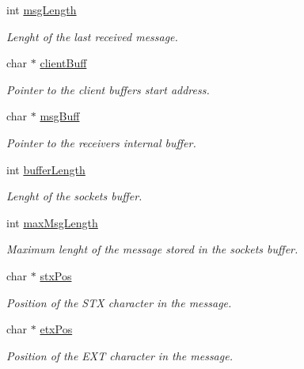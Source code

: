 \begin{DoxyCompactItemize}
\item 
int \hyperlink{struct_m_p___r_e_c_e_i_v_e_r_s_t_r_a470ff37d8c92bdd5c64fbdce0ad5231b}{msg\+Length}
\begin{DoxyCompactList}\small\item\em Lenght of the last received message. \end{DoxyCompactList}\item 
char $\ast$ \hyperlink{struct_m_p___r_e_c_e_i_v_e_r_s_t_r_ad7596f9bf59cc07314a716781969cf96}{client\+Buff}
\begin{DoxyCompactList}\small\item\em Pointer to the client buffer\textquotesingle{}s start address. \end{DoxyCompactList}\item 
char $\ast$ \hyperlink{struct_m_p___r_e_c_e_i_v_e_r_s_t_r_a79e1507f8db9f4b76e641a8ad6f05729}{msg\+Buff}
\begin{DoxyCompactList}\small\item\em Pointer to the receiver\textquotesingle{}s internal buffer. \end{DoxyCompactList}\item 
int \hyperlink{struct_m_p___r_e_c_e_i_v_e_r_s_t_r_a178a88ce8bf1f116a5d9ce779f71ca86}{buffer\+Length}
\begin{DoxyCompactList}\small\item\em Lenght of the socket\textquotesingle{}s buffer. \end{DoxyCompactList}\item 
int \hyperlink{struct_m_p___r_e_c_e_i_v_e_r_s_t_r_a26a2ef9150d7d3fe094647e715bb60a4}{max\+Msg\+Length}
\begin{DoxyCompactList}\small\item\em Maximum lenght of the message stored in the socket\textquotesingle{}s buffer. \end{DoxyCompactList}\item 
char $\ast$ \hyperlink{struct_m_p___r_e_c_e_i_v_e_r_s_t_r_ac1722435ceb1acbb5e33799c13e6564f}{stx\+Pos}
\begin{DoxyCompactList}\small\item\em Position of the S\+TX character in the message. \end{DoxyCompactList}\item 
char $\ast$ \hyperlink{struct_m_p___r_e_c_e_i_v_e_r_s_t_r_a39c0e3d40870be82eaa342fd58fe9ba9}{etx\+Pos}
\begin{DoxyCompactList}\small\item\em Position of the E\+XT character in the message. \end{DoxyCompactList}\item 

\end{DoxyCompactItemize}
